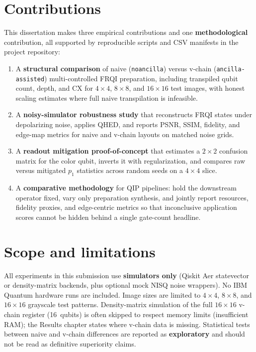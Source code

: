 \section{Contributions}
This dissertation makes three empirical contributions and one \textbf{methodological} contribution, all supported by reproducible scripts and CSV manifests in the project repository:
\begin{enumerate}
  \item A \textbf{structural comparison} of naive (\texttt{noancilla}) versus v-chain (\texttt{ancilla-assisted}) multi-controlled FRQI preparation, including transpiled qubit count, depth, and CX for $4\times 4$, $8\times 8$, and $16\times 16$ test images, with honest scaling estimates where full naive transpilation is infeasible.
  \item A \textbf{noisy-simulator robustness study} that reconstructs FRQI states under depolarizing noise, applies QHED, and reports PSNR, SSIM, fidelity, and edge-map metrics for naive and v-chain layouts on matched noise grids.
  \item A \textbf{readout mitigation proof-of-concept} that estimates a $2\times 2$ confusion matrix for the color qubit, inverts it with regularization, and compares raw versus mitigated $p_1$ statistics across random seeds on a $4\times 4$ slice.
  \item A \textbf{comparative methodology} for QIP pipelines: hold the downstream operator fixed, vary only preparation synthesis, and jointly report resources, fidelity proxies, and edge-centric metrics so that inconclusive application scores cannot be hidden behind a single gate-count headline.
\end{enumerate}

\section{Scope and limitations}
All experiments in this submission use \textbf{simulators only} (Qiskit Aer statevector or density-matrix backends, plus optional mock NISQ noise wrappers). No IBM Quantum hardware runs are included. Image sizes are limited to $4\times 4$, $8\times 8$, and $16\times 16$ grayscale test patterns. Density-matrix simulation of the full $16\times 16$ v-chain register (16~qubits) is often skipped to respect memory limits (insufficient RAM); the Results chapter states where v-chain data is missing. Statistical tests between naive and v-chain differences are reported as \textbf{exploratory} and should not be read as definitive superiority claims.

